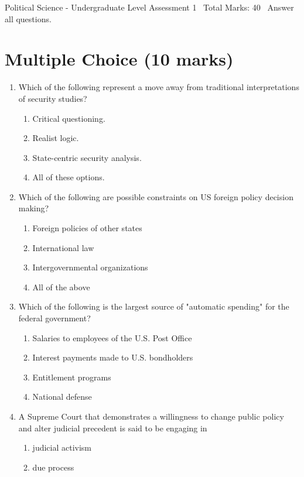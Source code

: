\documentclass[12pt]{article}
\begin{document}
\begin{center}
Political Science - Undergraduate Level Assessment 1 \
Total Marks: 40 \
Answer all questions.
\end{center}

\section*{Multiple Choice (10 marks)}
\begin{enumerate}[label=\arabic*.]
\item Which of the following represent a move away from traditional interpretations of security studies?
\begin{enumerate}[label=(\alph*)]
    \item Critical questioning.
    \item Realist logic.
    \item State-centric security analysis.
    \item All of these options.
\end{enumerate}
\item Which of the following are possible constraints on US foreign policy decision making?
\begin{enumerate}[label=(\alph*)]
    \item Foreign policies of other states
    \item International law
    \item Intergovernmental organizations
    \item All of the above
\end{enumerate}
\item Which of the following is the largest source of "automatic spending" for the federal government?
\begin{enumerate}[label=(\alph*)]
    \item Salaries to employees of the U.S. Post Office
    \item Interest payments made to U.S. bondholders
    \item Entitlement programs
    \item National defense
\end{enumerate}
\item A Supreme Court that demonstrates a willingness to change public policy and alter judicial precedent is said to be engaging in
\begin{enumerate}[label=(\alph*)]
    \item judicial activism
    \item due process

\end{enumerate}
\end{enumerate}
\end{document}

